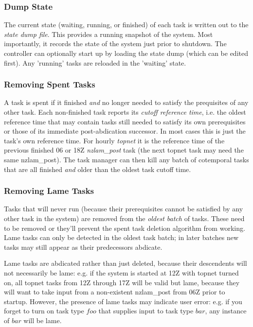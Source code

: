 \documentclass[11pt,a4paper]{report}
\begin{document}
\subsubsection{Dump State} 

The current state (waiting, running, or finished) of each task is
written out to the {\em state dump file}.  This provides a running
snapshot of the system. Most importantly, it records the state of the
system just prior to shutdown. The controller can optionally start up
by loading the state dump (which can be edited first). Any 'running'
tasks are reloaded in the 'waiting' state.

\subsubsection{Removing Spent Tasks} 

A task is spent if it finished {\em and} no longer needed to satisfy the
prequisites of any other task. Each non-finished task reports its {\em
cutoff reference time}, i.e. the oldest reference time that may contain
tasks still needed to satisfy its own prerequisites or those of its
immediate post-abdication successor.  In most cases this is just the
task's own reference time. For hourly {\em topnet} it is the reference
time of the previous finished 06 or 18Z {\em nzlam\_post} task (the next
topnet task may need the same nzlam\_post). The task manager can then
kill any batch of cotemporal tasks that are all finished {\em and} older
than the oldest task cutoff time.

\subsubsection{Removing Lame Tasks} 

Tasks that will never run (because their prerequisites cannot be
satisfied by any other task in the system) are removed from the {\em
oldest batch} of tasks.  These need to be removed or they'll prevent the
spent task deletion algorithm from working. Lame tasks can only be
detected in the oldest task batch; in later batches new tasks may still
appear as their predecessors abdicate.

Lame tasks are abdicated rather than just deleted, because their
descendents will not necessarily be lame: e.g. if the system is started
at 12Z with topnet turned on, all topnet tasks from 12Z through 17Z will
be valid but lame, because they will want to take input from a
non-existent nzlam\_post from 06Z prior to startup. However, the
presence of lame tasks may indicate user error: e.g. if you forget
to turn on task type $foo$ that supplies input to task type $bar$,
any instance of $bar$ will be lame.
\end{document}
